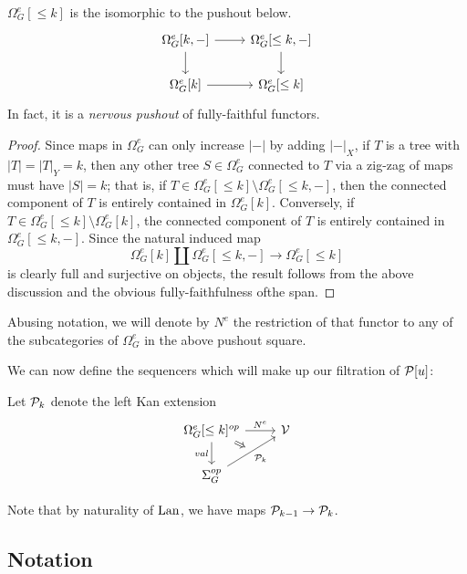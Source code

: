 \documentclass[a4paper,10pt]{article}%
\begin{document}
\begin{lemma}
  \label{TREE_CATS_DECOMP_LEMMA}
  $\Omega_G^e[\leq k]$ is the isomorphic to the pushout below.
  \[
  \begin{tikzcd}
    \Omega_G^{e}[k,-] \arrow[d] \arrow[r] & \Omega_G^{e}[\leq k,-] \arrow[d]\\
    \Omega_G^e[k] \arrow[r] & \Omega_G^e[\leq k]
  \end{tikzcd}
  \]
  In fact, it is a \textit{nervous pushout} of fully-faithful functors.%
\end{lemma}
\begin{proof}
  Since maps in $\Omega_G^e$ can only increase $|-|$ by adding $|-|_X$, if $T$ is a tree with $|T| = |T|_Y = k$, then any other tree $S\in \Omega_G^e$ connected to $T$ via a zig-zag of maps must have $|S| = k$; that is, if $T\in \Omega_G^e[\leq k] \setminus \Omega_G^e[\leq k, -]$, then the connected component of $T$ is entirely contained in $\Omega_G^e[k]$. Conversely, if $T \in \Omega_G^e[\leq k] \setminus \Omega_G^e[k]$, the connected component of $T$ is entirely contained in $\Omega_G^e[\leq k,-]$. Since the natural induced map
  \[
  \Omega_G^e[k] \amalg \Omega_G^e[\leq k,-] \to \Omega_G^e[\leq k]
  \]
  is clearly full and surjective on objects, the result follows from the above discussion and the obvious fully-faithfulness ofthe span. 
\end{proof}

Abusing notation, we will denote by $N^e$ the restriction of that functor to any of the subcategories of $\Omega_G^e$ in the above pushout square.

We can now define the sequencers which will make up our filtration of $\P[u]$:
\begin{definition}
  Let $\P_k$ denote the left Kan extension
\[
\begin{tikzcd}
  |[alias=U]| \Omega_G^e[\leq k]^{op} \arrow[r, "N^e"] \arrow[d, "val"'] & \V\\
  \Sigma_G^{op} \arrow[ur, "\P_k"', ""{name=V}]
  \arrow[Rightarrow, from=U, to=V]
\end{tikzcd}
\]
\end{definition}

Note that by naturality of $\Lan$, we have maps $\P_{k-1} \to \P_k$.

\subsection{Notation}
\end{document}
